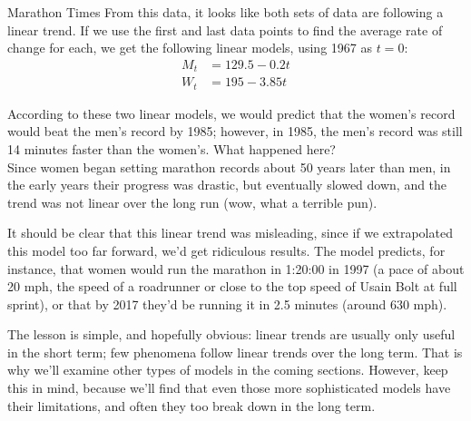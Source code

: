 \begin{example}[https://www.youtube.com/watch?v=3FeV7lvkATI&list=PLfmpjsIzhztutjEb8Pg5OBOlI1p80yVoy&index=4]{Marathon Times}
From this data, it looks like both sets of data are following a linear trend.  If we use the first and last data points to find the average rate of change for each, we get the following linear models, using 1967 as $t=0$:
\begin{align*}
M_t &= 129.5-0.2t\\
W_t &= 195-3.85t
\end{align*}

According to these two linear models, we would predict that the women's record would beat the men's record by 1985; however, in 1985, the men's record was still 14 minutes faster than the women's.  What happened here?\\

Since women began setting marathon records about 50 years later than men, in the early years their progress was drastic, but eventually slowed down, and the trend was not linear over the long run (wow, what a terrible pun).
\end{example}

It should be clear that this linear trend was misleading, since if we extrapolated this model too far forward, we'd get ridiculous results.  The model predicts, for instance, that women would run the marathon in 1:20:00 in 1997 (a pace of about 20 mph, the speed of a roadrunner or close to the top speed of Usain Bolt at full sprint), or that by 2017 they'd be running it in 2.5 minutes (around 630 mph).

The lesson is simple, and hopefully obvious: linear trends are usually only useful in the short term; few phenomena follow linear trends over the long term.  That is why we'll examine other types of models in the coming sections.  However, keep this in mind, because we'll find that even those more sophisticated models have their limitations, and often they too break down in the long term.